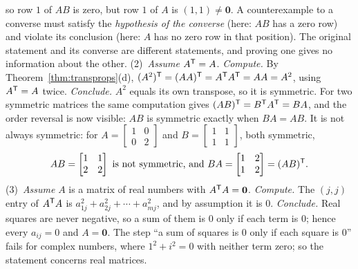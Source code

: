 \documentclass[11pt]{article}
\begin{document}
\begin{description}[leftmargin=0pt,itemsep=5pt]
so row $1$ of $AB$ is zero, but row $1$ of $A$ is $(1,1)\neq\mathbf{0}$. A counterexample to a converse must satisfy the \emph{hypothesis of the converse} (here: $AB$ has a zero row) and violate its conclusion (here: $A$ has no zero row in that position). The original statement and its converse are different statements, and proving one gives no information about the other. (2)~\emph{Assume} $A^{\mathsf T}=A$. \emph{Compute.} By Theorem~\ref{thm:transprops}(d), $(A^2)^{\mathsf T}=(AA)^{\mathsf T}=A^{\mathsf T} A^{\mathsf T}=AA=A^2$, using $A^{\mathsf T}=A$ twice. \emph{Conclude.} $A^2$ equals its own transpose, so it is symmetric. For two symmetric matrices the same computation gives $(AB)^{\mathsf T}=B^{\mathsf T} A^{\mathsf T}=BA$, and the order reversal is now visible: $AB$ is symmetric exactly when $BA=AB$. It is not always symmetric: for $A=\begin{bmatrix}1&0\\0&2\end{bmatrix}$ and $B=\begin{bmatrix}1&1\\1&1\end{bmatrix}$, both symmetric,
\[
AB=\begin{bmatrix}1&1\\2&2\end{bmatrix}\ \text{is not symmetric, and}\ BA=\begin{bmatrix}1&2\\1&2\end{bmatrix}=(AB)\T .
\] (3)~\emph{Assume} $A$ is a matrix of real numbers with $A^{\mathsf T} A=\mathbf{0}$. \emph{Compute.} The $(j,j)$ entry of $A^{\mathsf T} A$ is $a_{1j}^2+a_{2j}^2+\cdots+a_{mj}^2$, and by assumption it is $0$. \emph{Conclude.} Real squares are never negative, so a sum of them is $0$ only if each term is $0$; hence every $a_{ij}=0$ and $A=\mathbf{0}$. The step ``a sum of squares is $0$ only if each square is $0$'' fails for complex numbers, where $1^2+i^2=0$ with neither term zero; so the statement concerns real matrices.
\end{description}
\end{document}
